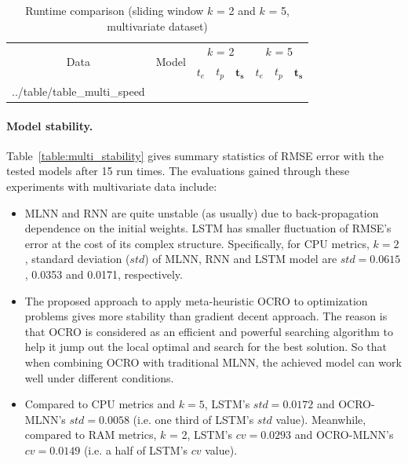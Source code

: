 \documentclass[smallcondensed, natbib]{svjour3}     %
\makeatletter
\newcommand\primitiveinput[1]
		{\@@input #1 }
\makeatother
\begin{document}
{%
\begin{table}[!h]
	\caption{Runtime comparison (sliding window $k$ = 2 and $k$ = 5, multivariate dataset)}
	\label{table:multi_speed}
	\centering
	\begin{adjustbox}{width=0.7\textwidth}
		\begin{tabular}{| c | c | c | c | c | c | c | c |}%
			\hline
			\multirow{2}{*}{Data} & \multirow{2}{*}{Model} & \multicolumn{3}{c|}{$k$ = 2} & \multicolumn{3}{c|}{ $k$ = 5 } \\ \cline{3-8}
   				& & $t_e$ & $t_p$ & $\boldsymbol{t_s}$ & $t_e$ & $t_p$ & $\boldsymbol{t_s}$  \\ [0.5ex] \hline
			\primitiveinput{../table/table_multi_speed}
			\hline
		\end{tabular}
	\end{adjustbox}
\end{table}

\paragraph{\textbf{Model stability.}} Table~\ref{table:multi_stability} gives summary statistics of RMSE error with the tested models after 15 run times. The evaluations gained through these experiments with multivariate data include:
\begin{itemize}
	\item MLNN and RNN are quite unstable (as usually) due to back-propagation dependence on the initial weights. LSTM has smaller fluctuation of RMSE's error at the cost of its complex structure. Specifically, for CPU metrics, $k = 2$, standard deviation ($std$) of MLNN, RNN and LSTM model are $std = 0.0615$, 0.0353 and 0.0171, respectively. 
	\item The proposed approach to apply meta-heuristic OCRO to optimization problems gives more stability than gradient decent approach. The reason is that OCRO is considered as an efficient and powerful searching algorithm to help it jump out the local optimal and search for the best solution. So that when combining OCRO with traditional MLNN, the achieved model can work well under different conditions. 
	\item Compared to CPU metrics and $k = 5$, LSTM's $std = 0.0172$ and OCRO-MLNN's $std= 0.0058$ (i.e. one third of LSTM's $std$ value). Meanwhile, compared to RAM metrics, $k$ = 2, LSTM's $cv = 0.0293$ and OCRO-MLNN's $cv=0.0149$ (i.e. a half of LSTM's $cv$ value). 
\end{itemize}

}
\end{document}
